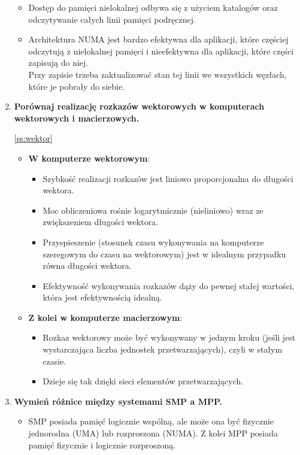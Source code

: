 \begin{enumerate}
\begin{samepage}
\begin{itemize}
				\item Dostęp do pamięci nielokalnej odbywa się z użyciem katalogów oraz odczytywanie całych linii pamięci podręcznej.
				\item Architektura NUMA jest bardzo efektywna dla aplikacji, które częściej odczytują z nielokalnej pamięci i nieefektywna dla aplikacji, które części zapisują do niej.\\
				Przy zapisie trzeba zaktualizować stan tej linii we wszystkich węzłach, które je pobrały do siebie.
			\end{itemize}
			\end{samepage}
			\item \textbf{Porównaj realizację rozkazów wektorowych w komputerach wektorowych i macierzowych.}
			\begin{samepage}
			\ref{ss:wektor}
			\begin{itemize}
				\item \textbf{W komputerze wektorowym}:
				\begin{itemize}
					\item Szybkość realizacji rozkazów jest liniowo proporcjonalna do długości wektora.
					\item Moc obliczeniowa rośnie logarytmicznie (nieliniowo) wraz ze zwiększeniem długości wektora.
					\item Przyspieszenie (stosunek czasu wykonywania na komputerze szeregowym do czasu na wektorowym) jest w idealnym przypadku równa długości wektora.
					\item Efektywność wykonywania rozkazów dąży do pewnej stałej wartości, która jest efektywnością idealną.
				\end{itemize}
				\item \textbf{Z kolei w komputerze macierzowym}:
				\begin{itemize}
					\item Rozkaz wektorowy może być wykonywany w jednym kroku (jeśli jest wystarczająca liczba jednostek przetwarzających), czyli w stałym czasie.
					\item Dzieje się tak dzięki sieci elementów przetwarzających.
				\end{itemize}
			\end{itemize}
			\end{samepage}
			\item \textbf{Wymień różnice między systemami SMP a MPP.}
			\begin{samepage}
			\begin{itemize}
				\item SMP posiada pamięć logicznie wspólną, ale może ona być fizycznie jednorodna (UMA) lub rozproszona (NUMA). Z kolei MPP posiada pamięć fizycznie i logicznie rozproszoną.

\end{itemize}
\end{samepage}
\end{enumerate}
